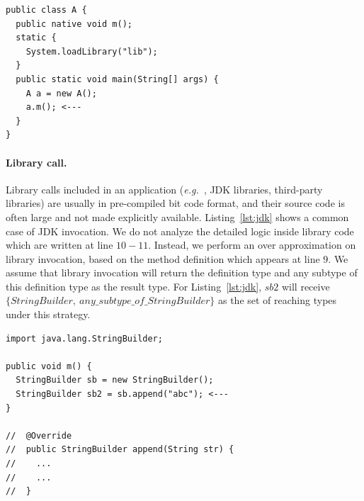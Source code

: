 \documentclass{fac}
\newcommand\eg{\textit{e.g.\ }}
\begin{document}
\begin{minipage}{\linewidth}
\vspace{10pt}
\begin{lstlisting}[caption={Example code of JNI},label={lst:jni}]
public class A {
  public native void m();
  static {
    System.loadLibrary("lib");
  }
  public static void main(String[] args) {
    A a = new A();
    a.m(); <---
  }
}
\end{lstlisting}
\end{minipage}


\paragraph{Library call.} Library calls included in an application (\eg, JDK libraries, third-party libraries) are usually in pre-compiled bit code format, and their source code is often large and not made explicitly available. Listing~\ref{lst:jdk} shows a common case of JDK invocation. We do not analyze the detailed logic inside library code which are written at line $10-11$. Instead, we perform an over approximation on library invocation, based on the method definition which appears at line $9$. We assume that library invocation will return the definition type and any subtype of this definition type as the result type. For Listing~\ref{lst:jdk}, $sb2$ will receive $\{StringBuilder,\ any\_subtype\_of\_StringBuilder\}$ as the set of reaching types under this strategy.

\begin{minipage}{\linewidth}
\vspace{10pt}
\begin{lstlisting}[caption={Example of JDK library call},label={lst:jdk}]
import java.lang.StringBuilder;

public void m() {
  StringBuilder sb = new StringBuilder();
  StringBuilder sb2 = sb.append("abc"); <---
}

//  @Override
//  public StringBuilder append(String str) {
//    ...
//    ...
//  }
\end{lstlisting}
\end{minipage}

\end{document}
